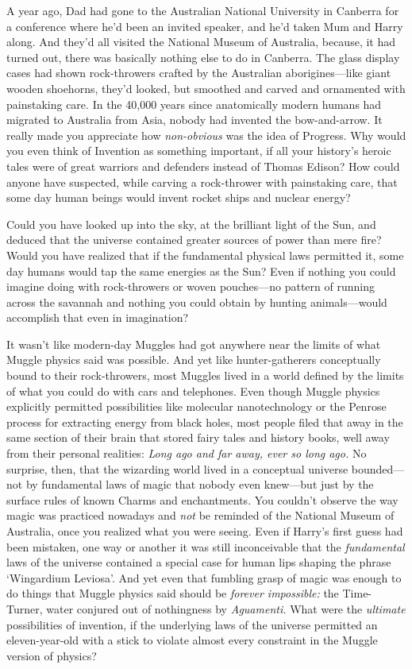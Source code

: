 A year ago, Dad had gone to the Australian National University in Canberra for a conference where he'd been an invited speaker, and he'd taken Mum and Harry along. And they'd all visited the National Museum of Australia, because, it had turned out, there was basically nothing else to do in Canberra. The glass display cases had shown rock-throwers crafted by the Australian aborigines---like giant wooden shoehorns, they'd looked, but smoothed and carved and ornamented with painstaking care. In the 40,000 years since anatomically modern humans had migrated to Australia from Asia, nobody had invented the bow-and-arrow. It really made you appreciate how \emph{non-obvious} was the idea of Progress. Why would you even think of Invention as something important, if all your history's heroic tales were of great warriors and defenders instead of Thomas Edison? How could anyone have suspected, while carving a rock-thrower with painstaking care, that some day human beings would invent rocket ships and nuclear energy?

Could you have looked up into the sky, at the brilliant light of the Sun, and deduced that the universe contained greater sources of power than mere fire? Would you have realized that if the fundamental physical laws permitted it, some day humans would tap the same energies as the Sun? Even if nothing you could imagine doing with rock-throwers or woven pouches---no pattern of running across the savannah and nothing you could obtain by hunting animals---would accomplish that even in imagination?

It wasn't like modern-day Muggles had got anywhere near the limits of what Muggle physics said was possible. And yet like hunter-gatherers conceptually bound to their rock-throwers, most Muggles lived in a world defined by the limits of what you could do with cars and telephones. Even though Muggle physics explicitly permitted possibilities like molecular nanotechnology or the Penrose process for extracting energy from black holes, most people filed that away in the same section of their brain that stored fairy tales and history books, well away from their personal realities: \emph{Long ago and far away, ever so long ago.} No surprise, then, that the wizarding world lived in a conceptual universe bounded---not by fundamental laws of magic that nobody even knew---but just by the surface rules of known Charms and enchantments. You couldn't observe the way magic was practiced nowadays and \emph{not} be reminded of the National Museum of Australia, once you realized what you were seeing. Even if Harry's first guess had been mistaken, one way or another it was still inconceivable that the \emph{fundamental} laws of the universe contained a special case for human lips shaping the phrase `Wingardium Leviosa'. And yet even that fumbling grasp of magic was enough to do things that Muggle physics said should be \emph{forever impossible:} the Time-Turner, water conjured out of nothingness by \emph{Aguamenti.} What were the \emph{ultimate} possibilities of invention, if the underlying laws of the universe permitted an eleven-year-old with a stick to violate almost every constraint in the Muggle version of physics?

